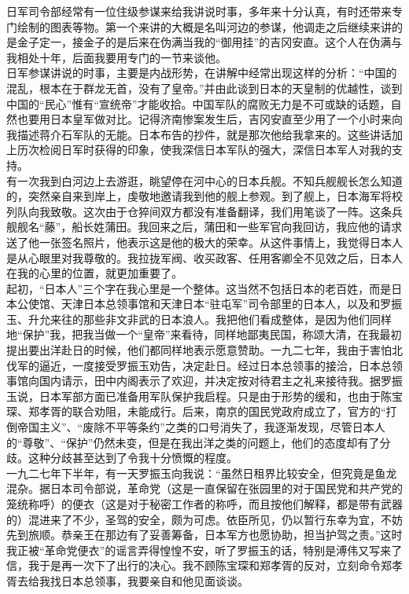 日军司令部经常有一位住级参谋来给我讲说时事，多年来十分认真，有时还带来专门绘制的图表等物。第一个来讲的大概是名叫河边的参谋，他调走之后继续来讲的是金子定一，接金子的是后来在伪满当我的“御用挂”的吉冈安直。这个人在伪满与我相处十年，后面我要用专门的一节来谈他。\\

日军参谋讲说的时事，主要是内战形势，在讲解中经常出现这样的分析：“中国的混乱，根本在于群龙无首，没有了皇帝。”并由此谈到日本的天皇制的优越性，谈到中国的“民心”惟有“宣统帝”才能收拾。中国军队的腐败无力是不可或缺的话题，自然也要用日本皇军做对比。记得济南惨案发生后，吉冈安直至少用了一个小时来向我描述蒋介石军队的无能。日本布告的抄件，就是那次他给我拿来的。这些讲话加上历次检阅日军时获得的印象，使我深信日本军队的强大，深信日本军人对我的支持。\\

有一次我到白河边上去游逛，眺望停在河中心的日本兵舰。不知兵舰舰长怎么知道的，突然亲自来到岸上，虔敬地邀请我到他的舰上参观。到了舰上，日本海军将校列队向我致敬。这次由于仓猝间双方都没有准备翻译，我们用笔谈了一阵。这条兵舰舰名“藤”，船长姓蒲田。我回来之后，蒲田和一些军官向我回访，我应他的请求送了他一张签名照片，他表示这是他的极大的荣幸。从这件事情上，我觉得日本人是从心眼里对我尊敬的。我拉拢军阀、收买政客、任用客卿全不见效之后，日本人在我的心里的位置，就更加重要了。\\

起初，“日本人”三个字在我心里是一个整体。这当然不包括日本的老百姓，而是日本公使馆、天津日本总领事馆和天津日本“驻屯军”司令部里的日本人，以及和罗振玉、升允来往的那些非文非武的日本浪人。我把他们看成整体，是因为他们同样地“保护”我，把我当做一个“皇帝”来看待，同样地鄙夷民国，称颂大清，在我最初提出要出洋赴日的时候，他们都同样地表示愿意赞助。一九二七年，我由于害怕北伐军的逼近，一度接受罗振玉劝告，决定赴日。经过日本总领事的接洽，日本总领事馆向国内请示，田中内阁表示了欢迎，并决定按对待君主之礼来接待我。据罗振玉说，日本军部方面已准备用军队保护我启程。只是由于形势的缓和，也由于陈宝琛、郑孝胥的联合劝阻，未能成行。后来，南京的国民党政府成立了，官方的“打倒帝国主义”、“废除不平等条约”之类的口号消失了，我逐渐发现，尽管日本人的“尊敬”、“保护”仍然未变，但是在我出洋之类的问题上，他们的态度却有了分歧。这种分歧甚至达到了令我十分愤慨的程度。\\

一九二七年下半年，有一天罗振玉向我说：“虽然日租界比较安全，但究竟是鱼龙混杂。据日本司令部说，革命党（这是一直保留在张园里的对于国民党和共产党的笼统称呼）的便衣（这是对于秘密工作者的称呼，而且按他们解释，都是带有武器的）混进来了不少，圣驾的安全，颇为可虑。依臣所见，仍以暂行东幸为宜，不妨先到旅顺。恭亲王在那边有了妥善筹备，日本军方也愿协助，担当护驾之责。”这时我正被“革命党便衣”的谣言弄得惶惶不安，听了罗振玉的话，特别是溥伟又写来了信，我于是再一次下了出行的决心。我不顾陈宝琛和郑孝胥的反对，立刻命令郑孝胥去给我找日本总领事，我要亲自和他见面谈谈。\\

